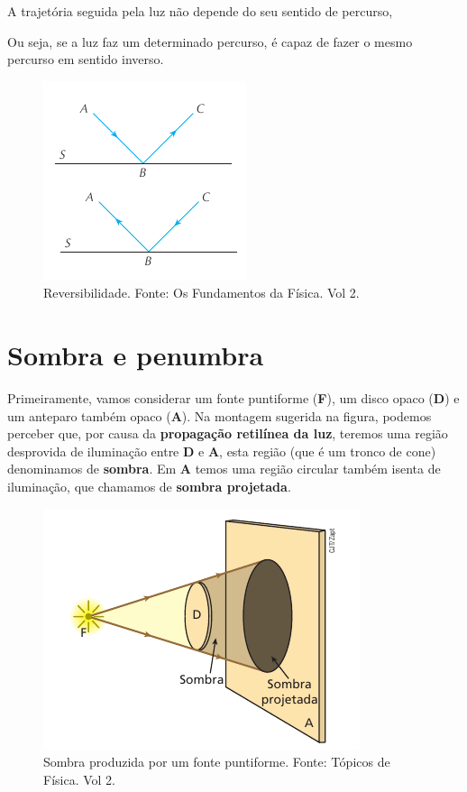 \documentclass[11pt,twocolumn,oneside]{article}
\begin{document}
A trajetória seguida pela luz não depende do seu sentido de percurso,


Ou seja, se a luz faz um determinado percurso, é capaz de fazer o mesmo percurso em sentido inverso.


\begin{figure}[h]{}
\centering\includegraphics[width=2.5truein]{img17.png}
\caption{Reversibilidade. Fonte: Os Fundamentos da Física. Vol 2.}
\centering
\end{figure}

\hypertarget{x-sombra-e-penumbra}{\section{Sombra e penumbra}}
Primeiramente, vamos considerar um fonte puntiforme (\textbf{F}), um disco opaco (\textbf{D}) e um anteparo também opaco (\textbf{A}). Na montagem sugerida na figura, podemos perceber que, por causa da \textbf{propagação retilínea da luz}, teremos uma região desprovida de iluminação entre \textbf{D} e \textbf{A}, esta região (que é um tronco de cone) denominamos de \textbf{sombra}. Em \textbf{A} temos uma região circular também isenta de iluminação, que chamamos de \textbf{sombra projetada}.


\begin{figure}[h]{}
\centering\includegraphics[width=2.5truein]{img18.png}
\caption{Sombra produzida por um fonte puntiforme. Fonte: Tópicos de Física. Vol 2.}
\centering
\end{figure}
\end{document}
